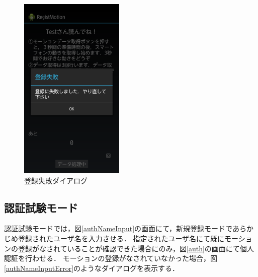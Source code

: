 \documentclass[11pt]{jreport}
\begin{document}
\begin{figure}[htbp]
\begin{minipage}{0.33\hsize}
            \end{minipage}
            \begin{minipage}{0.33\hsize}
                \begin{center}
                    \includegraphics[width=5cm, bb=0 0 540 960]{RegFail.pdf}
                \end{center}
                \caption{登録失敗ダイアログ}
                \label{regFail}
            \end{minipage}
        \end{figure}

        \newpage
	    \subsection{認証試験モード}
        認証試験モードでは，図\ref{authNameInput}の画面にて，新規登録モードであらかじめ登録されたユーザ名を入力させる．
        指定されたユーザ名にて既にモーションの登録がなされていることが確認できた場合にのみ，図\ref{auth}の画面にて個人認証を行わせる．
        モーションの登録がなされていなかった場合，図\ref{authNameInputError}のようなダイアログを表示する．
\end{document}
